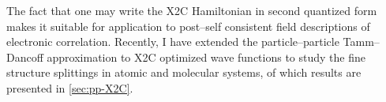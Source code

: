 
The fact that one may write the X2C Hamiltonian in second quantized form makes it
suitable for application to post--self consistent field descriptions of
electronic correlation. Recently, I have extended the particle--particle
Tamm--Dancoff approximation to X2C optimized wave functions to study the fine
structure splittings in atomic and molecular systems, of which results are
presented in \cref{sec:pp-X2C}.


